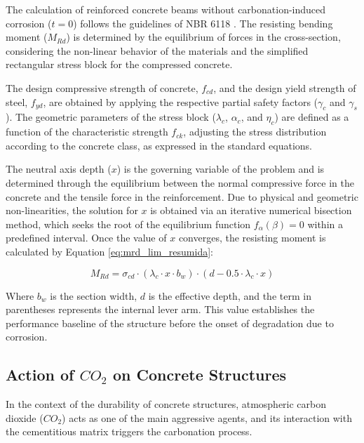 The calculation of reinforced concrete beams without carbonation-induced corrosion ($t=0$) follows the guidelines of NBR 6118 \cite{associacao_brasileira_de_normas_tecnicas_nbr_2023}. The resisting bending moment ($M_{Rd}$) is determined by the equilibrium of forces in the cross-section, considering the non-linear behavior of the materials and the simplified rectangular stress block for the compressed concrete.

The design compressive strength of concrete, $f_{cd}$, and the design yield strength of steel, $f_{yd}$, are obtained by applying the respective partial safety factors ($\gamma_c$ and $\gamma_s$). The geometric parameters of the stress block ($\lambda_c$, $\alpha_c$, and $\eta_c$) are defined as a function of the characteristic strength $f_{ck}$, adjusting the stress distribution according to the concrete class, as expressed in the standard equations.

The neutral axis depth ($x$) is the governing variable of the problem and is determined through the equilibrium between the normal compressive force in the concrete and the tensile force in the reinforcement. Due to physical and geometric non-linearities, the solution for $x$ is obtained via an iterative numerical bisection method, which seeks the root of the equilibrium function $f_\alpha(\beta) = 0$ within a predefined interval. Once the value of $x$ converges, the resisting moment is calculated by Equation \eqref{eq:mrd_lim_resumida}:

\begin{equation}\label{eq:mrd_lim_resumida}
M_{Rd} = \sigma_{cd} \cdot (\lambda_c \cdot x \cdot b_w) \cdot (d - 0.5 \cdot \lambda_c \cdot x)
\end{equation}

Where $b_w$ is the section width, $d$ is the effective depth, and the term in parentheses represents the internal lever arm. This value establishes the performance baseline of the structure before the onset of degradation due to corrosion.

\subsection{Action of $CO_2$ on Concrete Structures}

In the context of the durability of concrete structures, atmospheric carbon dioxide ($CO_2$) acts as one of the main aggressive agents, and its interaction with the cementitious matrix triggers the carbonation process.

